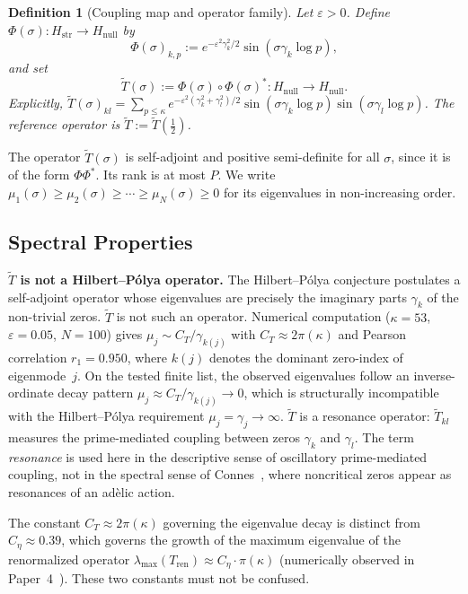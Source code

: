 \documentclass[11pt]{article}
\newtheorem{definition}[theorem]{Definition}
\newcommand{\Hstr}{H_{\mathrm{str}}}
\newcommand{\Hnull}{H_{\mathrm{null}}}
\newcommand{\Tt}{\widetilde{T}}
\newcommand{\Ceta}{C_{\eta}}
\newcommand{\CT}{C_{T}}
\begin{document}
\begin{definition}[Coupling map and operator family]
\label{def:coupling}
Let $\varepsilon>0$.
Define $\Phi(\sigma)\colon\Hstr\to\Hnull$ by
\[
\Phi(\sigma)_{k,p} := e^{-\varepsilon^2\gamma_k^2/2}\sin(\sigma\gamma_k\log p),
\]
and set
\[
\Tt(\sigma) := \Phi(\sigma)\circ\Phi(\sigma)^*\colon\Hnull\to\Hnull.
\]
Explicitly,
$\Tt(\sigma)_{kl}
  = \sum_{p\leq\kappa} e^{-\varepsilon^2(\gamma_k^2+\gamma_l^2)/2}
    \sin(\sigma\gamma_k\log p)\sin(\sigma\gamma_l\log p)$.
The reference operator is $\Tt := \Tt(\tfrac{1}{2})$.
\end{definition}

The operator $\Tt(\sigma)$ is self-adjoint and positive semi-definite
for all $\sigma$, since it is of the form $\Phi\Phi^*$.
Its rank is at most $P$.
We write $\mu_1(\sigma)\geq\mu_2(\sigma)\geq\cdots\geq\mu_N(\sigma)\geq 0$
for its eigenvalues in non-increasing order.

\subsection{Spectral Properties}
\label{ssec:spectral}

\textbf{$\Tt$ is not a Hilbert--P\'olya operator.}
The Hilbert--P\'olya conjecture postulates a self-adjoint operator
whose eigenvalues are precisely the imaginary parts $\gamma_k$ of the
non-trivial zeros.
$\Tt$ is not such an operator.
Numerical computation ($\kappa=53$, $\varepsilon=0.05$, $N=100$) gives
$\mu_j\sim\CT/\gamma_{k(j)}$ with $\CT\approx 2\pi(\kappa)$
and Pearson correlation $r_1=0.950$,
where $k(j)$ denotes the dominant zero-index of eigenmode~$j$.
On the tested finite list, the observed eigenvalues follow an
inverse-ordinate decay pattern $\mu_j\approx\CT/\gamma_{k(j)}\to0$,
which is structurally incompatible with the Hilbert--P\'olya
requirement $\mu_j=\gamma_j\to\infty$.
$\Tt$ is a resonance operator: $\Tt_{kl}$ measures the prime-mediated
coupling between zeros $\gamma_k$ and $\gamma_l$.
The term \emph{resonance} is used here in the descriptive sense of
oscillatory prime-mediated coupling, not in the spectral sense of
Connes~\cite{Connes}, where noncritical zeros appear as resonances
of an ad\`elic action.

The constant $\CT\approx 2\pi(\kappa)$ governing the eigenvalue decay
is distinct from $\Ceta\approx 0.39$, which governs the growth of the
maximum eigenvalue of the renormalized operator
$\lambda_{\max}(T_{\mathrm{ren}})\approx\Ceta\cdot\pi(\kappa)$
(numerically observed in Paper~4~\cite{Paper4}).
These two constants must not be confused.
\end{document}
